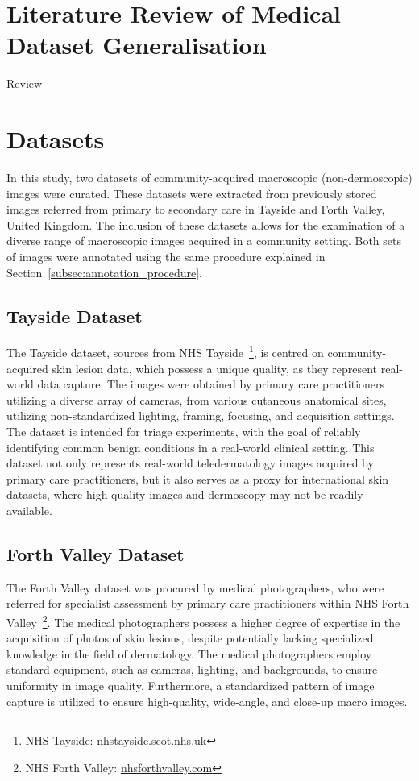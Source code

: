\section{Literature Review of Medical Dataset Generalisation}
\label{sec:generalisation_review}
Review



\section{Datasets}
\label{sec:generalisation_datasets}
In this study, two datasets of community-acquired macroscopic (non-dermoscopic) images were curated. These datasets were extracted from previously stored images referred from primary to secondary care in Tayside and Forth Valley, United Kingdom. The inclusion of these datasets allows for the examination of a diverse range of macroscopic images acquired in a community setting. Both sets of images were annotated using the same procedure explained in Section~\ref{subsec:annotation_procedure}.

\subsection{Tayside Dataset}
\label{subsec:tayside_dataset}
The Tayside dataset, sources from NHS Tayside~\footnote{NHS Tayside: \url{nhstayside.scot.nhs.uk}}, is centred on community-acquired skin lesion data, which possess a unique quality, as they represent real-world data capture. The images were obtained by primary care practitioners utilizing a diverse array of cameras, from various cutaneous anatomical sites, utilizing non-standardized lighting, framing, focusing, and acquisition settings. The dataset is intended for triage experiments, with the goal of reliably identifying common benign conditions in a real-world clinical setting. This dataset not only represents real-world teledermatology images acquired by primary care practitioners, but it also serves as a proxy for international skin datasets, where high-quality images and dermoscopy may not be readily available.

\subsection{Forth Valley Dataset}
\label{subsec:forth_valley_dataset}
The Forth Valley dataset was procured by medical photographers, who were referred for specialist assessment by primary care practitioners within NHS Forth Valley~\footnote{NHS Forth Valley: \url{nhsforthvalley.com}}. The medical photographers possess a higher degree of expertise in the acquisition of photos of skin lesions, despite potentially lacking specialized knowledge in the field of dermatology. The medical photographers employ standard equipment, such as cameras, lighting, and backgrounds, to ensure uniformity in image quality. Furthermore, a standardized pattern of image capture is utilized to ensure high-quality, wide-angle, and close-up macro images.


